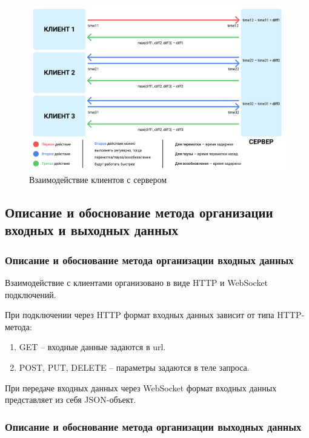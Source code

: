 \documentclass{../includes/TechDoc}
\begin{document}
	\begin{figure}[h]
        \centering
        \includegraphics[width=1\linewidth]{images/interaction_format.png}
        \caption{Взаимодействие клиентов с сервером}
        \label{fig:interaction_format}
    \end{figure}

    \clearpage

    \subsection{Описание и обоснование метода организации входных и выходных данных}

    \subsubsection{Описание и обоснование метода организации входных данных}

    Взаимодействие с клиентами организовано в виде HTTP и WebSocket подключений.

    При подключении через HTTP формат входных данных зависит от типа HTTP-метода:
    \begin{enumerate}
		\item GET -- входные данные задаются в url.
		\item POST, PUT, DELETE -- параметры задаются в теле запроса.
	\end{enumerate}

	При передаче входных данных через WebSocket формат входных данных представляет из себя JSON-объект.

	\subsubsection{Описание и обоснование метода организации выходных данных}
\end{document}
